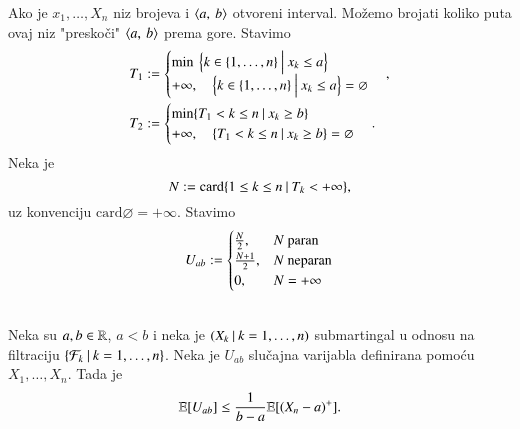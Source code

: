 Ako je $x_1, \ldots, X_n$ niz brojeva i $\langle {a}, \: {b} \rangle$ otvoreni interval.
Mo\v zemo brojati koliko puta ovaj niz "presko\v ci" $\langle {a}, \: {b} \rangle$ prema gore.
Stavimo
\begin{equation*}
    \begin{aligned}
        T_1 &:=
        \begin{cases}
            \min \: \Big\{{k \in \{1, \ldots, n\}} \: \Big| \: { x_k \leq a}\Big\}\\
            +\infty, \quad \Big\{{k \in \{1, \ldots, n\}} \: \Big| \: { x_k \leq a}\Big\} = \varnothing
        \end{cases},\\
        T_2 &:=
        \begin{cases}
            \min \{{ T_1 < k \leq n} \: | \: { x_k \geq b}\}\\
            +\infty, \quad \{{T_1 < k \leq n} \: | \: { x_k \geq b}\} = \varnothing
        \end{cases}.
    \end{aligned}
\end{equation*}
Neka je
\begin{equation*}
    N := \mathrm{card} \{{1 \leq k \leq n} \: | \: {T_k < +\infty}\},
\end{equation*}
uz konvenciju $\mathrm{card} \varnothing = +\infty$.
Stavimo
\begin{equation*}
    U_{a b} :=
    \begin{cases}
        \frac{N}{2},& N \textnormal{ paran}\\
        \frac{N + 1}{2},& N \textnormal{ neparan}\\
        0,& N = +\infty
    \end{cases}
\end{equation*}

\begin{tm}    \label{tm:24.2}
    \quad \\
    Neka su $a, b \in \mathbb{R}$, $a < b$ i neka je $({X_k} \: | \: {k = 1, \ldots, n})$ submartingal u odnosu na filtraciju $\{{\mathcal{F}_k} \: | \: {k = 1, \ldots, n}\}$.
    Neka je $U_{a b}$ slu\v cajna varijabla definirana pomo\' cu $X_1, \ldots, X_n$.
    Tada je
    \begin{equation*}
        \mathbb{E} [U_{a b}] \leq \frac{1}{b - a} \mathbb{E} [(X_n - a)^+].
    \end{equation*}
\end{tm}

